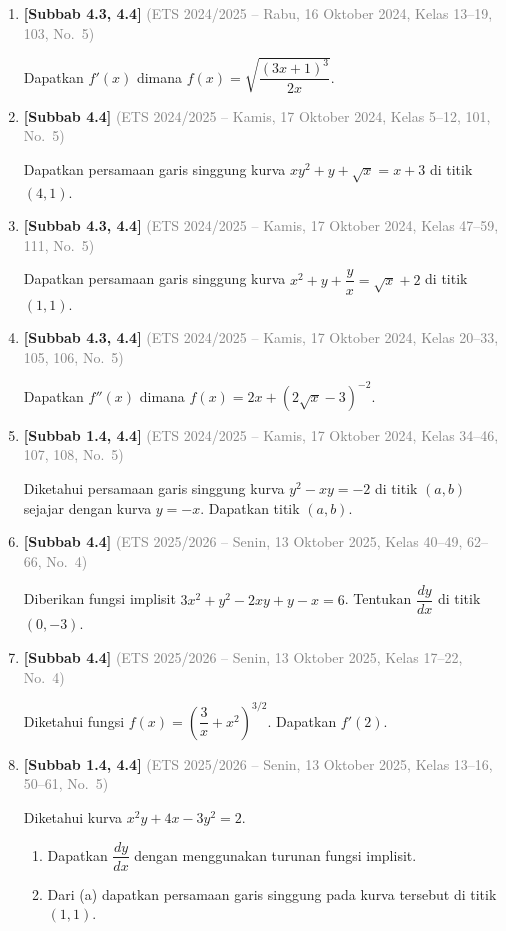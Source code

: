 \documentclass[10pt,openany,a4paper]{article}
\theoremstyle{definition}
\theoremstyle{definition}
\theoremstyle{plain}
\begin{document}
\begin{enumerate}
    \item \textbf{[Subbab 4.3, 4.4]} {\footnotesize\textcolor{gray}{(ETS 2024/2025 -- Rabu, 16 Oktober 2024, Kelas 13--19, 103, No.~5)}}\par
    Dapatkan $f'(x)$ dimana $f(x)=\sqrt{\dfrac{(3x+1)^3}{2x}}$.

    \item \textbf{[Subbab 4.4]} {\footnotesize\textcolor{gray}{(ETS 2024/2025 -- Kamis, 17 Oktober 2024, Kelas 5--12, 101, No.~5)}}\par
    Dapatkan persamaan garis singgung kurva $xy^2+y+\sqrt{x}=x+3$ di titik $(4,1)$.

    \item \textbf{[Subbab 4.3, 4.4]} {\footnotesize\textcolor{gray}{(ETS 2024/2025 -- Kamis, 17 Oktober 2024, Kelas 47--59, 111, No.~5)}}\par
    Dapatkan persamaan garis singgung kurva $x^2+y+\dfrac{y}{x}=\sqrt{x}+2$ di titik $(1,1)$.

    \item \textbf{[Subbab 4.3, 4.4]} {\footnotesize\textcolor{gray}{(ETS 2024/2025 -- Kamis, 17 Oktober 2024, Kelas 20--33, 105, 106, No.~5)}}\par
    Dapatkan $f''(x)$ dimana $f(x)=2x+\left(2\sqrt{x}-3\right)^{-2}$.

    \item \textbf{[Subbab 1.4, 4.4]} {\footnotesize\textcolor{gray}{(ETS 2024/2025 -- Kamis, 17 Oktober 2024, Kelas 34--46, 107, 108, No.~5)}}\par
    Diketahui persamaan garis singgung kurva $y^2-xy=-2$ di titik $(a,b)$ sejajar dengan kurva $y=-x$. Dapatkan titik $(a,b)$.

    \item \textbf{[Subbab 4.4]} {\footnotesize\textcolor{gray}{(ETS 2025/2026 -- Senin, 13 Oktober 2025, Kelas 40--49, 62--66, No.~4)}}\par
    Diberikan fungsi implisit $3x^2 + y^2 - 2xy + y - x = 6$. Tentukan $\dfrac{dy}{dx}$ di titik $(0,-3)$.

    \item \textbf{[Subbab 4.4]} {\footnotesize\textcolor{gray}{(ETS 2025/2026 -- Senin, 13 Oktober 2025, Kelas 17--22, No.~4)}}\par
    Diketahui fungsi $f(x)=\left(\dfrac{3}{x}+x^2\right)^{3/2}$. Dapatkan $f'(2)$.

    \item \textbf{[Subbab 1.4, 4.4]} {\footnotesize\textcolor{gray}{(ETS 2025/2026 -- Senin, 13 Oktober 2025, Kelas 13--16, 50--61, No.~5)}}\par
    Diketahui kurva $x^2y+4x-3y^2=2$.
    \begin{enumerate}
        \item Dapatkan $\dfrac{dy}{dx}$ dengan menggunakan turunan fungsi implisit.
        \item Dari (a) dapatkan persamaan garis singgung pada kurva tersebut di titik $(1,1)$.
    \end{enumerate}


\end{enumerate}
\end{document}
